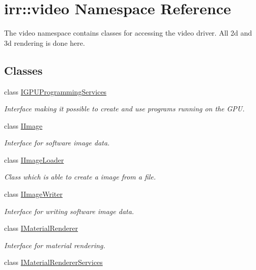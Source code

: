 \hypertarget{namespaceirr_1_1video}{}\section{irr\+:\+:video Namespace Reference}
\label{namespaceirr_1_1video}


The video namespace contains classes for accessing the video driver. All 2d and 3d rendering is done here.  


\subsection*{Classes}
\begin{DoxyCompactItemize}
\item 
class \hyperlink{classirr_1_1video_1_1IGPUProgrammingServices}{I\+G\+P\+U\+Programming\+Services}
\begin{DoxyCompactList}\small\item\em Interface making it possible to create and use programs running on the G\+PU. \end{DoxyCompactList}\item 
class \hyperlink{classirr_1_1video_1_1IImage}{I\+Image}
\begin{DoxyCompactList}\small\item\em Interface for software image data. \end{DoxyCompactList}\item 
class \hyperlink{classirr_1_1video_1_1IImageLoader}{I\+Image\+Loader}
\begin{DoxyCompactList}\small\item\em Class which is able to create a image from a file. \end{DoxyCompactList}\item 
class \hyperlink{classirr_1_1video_1_1IImageWriter}{I\+Image\+Writer}
\begin{DoxyCompactList}\small\item\em Interface for writing software image data. \end{DoxyCompactList}\item 
class \hyperlink{classirr_1_1video_1_1IMaterialRenderer}{I\+Material\+Renderer}
\begin{DoxyCompactList}\small\item\em Interface for material rendering. \end{DoxyCompactList}\item 
class \hyperlink{classirr_1_1video_1_1IMaterialRendererServices}{I\+Material\+Renderer\+Services}

\end{DoxyCompactItemize}
